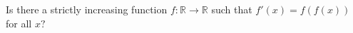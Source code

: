 Is there a strictly increasing function $f:\mathbb{R}\to\mathbb{R}$ such that $f'(x)=f(f(x))$ for all $x?$